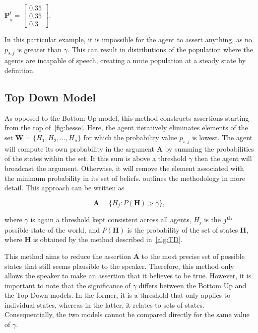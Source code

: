 \begin{center}
    
$\underline{\mathbf{P}}^t_s = \begin{bmatrix}
    0.35\\
    0.35\\
    0.3
\end{bmatrix}.$
\end{center}

In this particular example, it is impossible for the agent to assert anything, as no $p_{s,j}$ is greater than $\gamma$. This can result in distributions of the population where the agents are incapable of speech, creating a mute population at a steady state by definition. 

\subsection*{Top Down Model}

As opposed to the Bottom Up model, this method constructs  assertions starting from the top of~\cref{fig:hesse}. Here, the agent iteratively eliminates elements of the set $\mathbf{W} = \{H_1, H_2, \dots, H_n  \}$ for which the probability value $p_{s,j}$ is lowest. The agent will compute its own probability in the argument $\mathbf{A}$ by summing the probabilities of the states within the set. If this sum is above a threshold $\gamma$ then the agent will broadcast the argument. Otherwise, it will remove the element associated with the minimum probability in its set of beliefs.  outlines the methodology in more detail. This approach can be written as


\begin{equation}
    \mathbf{A} = \{ H_j: P(\mathbf{H}) > \gamma  \},
\end{equation}

where $\gamma$ is again a threshold kept consistent across all agents, $H_j$ is the $j^{\textnormal{th}}$ possible state of the world, and $P(\mathbf{H})$ is the probability of the set of states $\mathbf{H}$, where $\mathbf{H}$ is obtained by the method described in~\cref{alg:TD}.

This method aims to reduce the assertion $\mathbf{A}$ to the most precise set of possible states that still seems plausible to the speaker. Therefore, this method only allows the speaker to make an assertion that it believes to be true. However, it is important to note that the significance of $\gamma$ differs between the Bottom Up and the Top Down models. In the former, it is a threshold that only applies to individual states, whereas in the latter, it relates to sets of states. Consequentially, the two models cannot be compared directly for the same value of $\gamma$. \\

